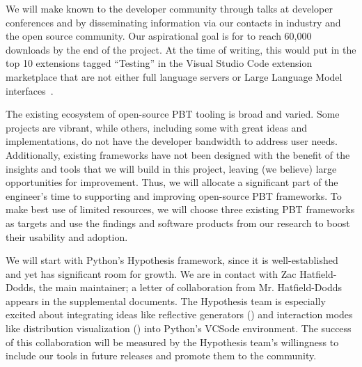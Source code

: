 We will make \tyche{} known to the developer community through talks at developer
conferences and by
disseminating information via our contacts in industry and the open source
community.
%
Our aspirational goal is for \tyche{} to reach 60,000 downloads by the end of the
project. At
the time of writing, this would put \tyche{} in the top 10 extensions
tagged ``Testing'' in the Visual Studio Code extension marketplace
that are not either full language servers or Large
Language Model interfaces~\cite{noauthor_testing_nodate}.


The existing ecosystem of open-source PBT tooling is broad and varied. Some
projects are vibrant, while others, including some with
great ideas and implementations, do not have the developer bandwidth to address
user needs. Additionally, existing frameworks have not been designed with
the benefit of the insights and tools that we will build in this
project, leaving (we believe) large opportunities for improvement.
Thus, we will allocate a significant part of the engineer's time to
supporting and improving open-source PBT frameworks.
%
To make best use of limited resources, we will choose three existing PBT
frameworks as targets and use the findings and software products from
our research to boost their usability and adoption. 

We will start
with Python's Hypothesis framework, since it is well-established and yet has
significant room for growth.  We are in contact with Zac Hatfield-Dodds, the
main maintainer; a letter of collaboration from Mr.{}
Hatfield-Dodds appears in the supplemental documents. The Hypothesis team is
especially excited about integrating ideas like reflective generators
() and interaction modes like distribution
visualization () into Python's VCSode environment.
The success of this collaboration will be measured by the Hypothesis team's
willingness to include our tools in future releases and promote them to the
community.

